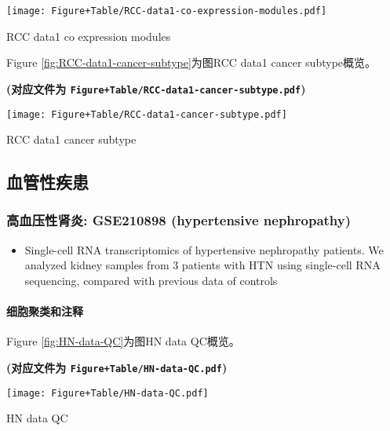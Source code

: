 \documentclass[
]{article}
\providecommand{\tightlist}{%
  \setlength{\itemsep}{0pt}\setlength{\parskip}{0pt}}
\begin{document}
\def\@captype{figure}
\begin{center}
\texttt{[image: Figure+Table/RCC-data1-co-expression-modules.pdf]}
\caption{RCC data1 co expression modules}\label{fig:RCC-data1-co-expression-modules}
\end{center}

Figure \ref{fig:RCC-data1-cancer-subtype}为图RCC data1 cancer subtype概览。

\textbf{(对应文件为 \texttt{Figure+Table/RCC-data1-cancer-subtype.pdf})}

\def\@captype{figure}
\begin{center}
\texttt{[image: Figure+Table/RCC-data1-cancer-subtype.pdf]}
\caption{RCC data1 cancer subtype}\label{fig:RCC-data1-cancer-subtype}
\end{center}

\hypertarget{ux8840ux7ba1ux6027ux75beux60a3}{%
\subsection{血管性疾患}\label{ux8840ux7ba1ux6027ux75beux60a3}}

\hypertarget{ux9ad8ux8840ux538bux6027ux80beux708e-gse210898-hypertensive-nephropathy}{%
\subsubsection{高血压性肾炎: GSE210898 (hypertensive nephropathy)}\label{ux9ad8ux8840ux538bux6027ux80beux708e-gse210898-hypertensive-nephropathy}}

\begin{itemize}
\tightlist
\item
  Single-cell RNA transcriptomics of hypertensive nephropathy patients. We
  analyzed kidney samples from 3 patients with HTN using single-cell RNA
  sequencing, compared with previous data of controls
\end{itemize}

\hypertarget{ux7ec6ux80deux805aux7c7bux548cux6ce8ux91ca-1}{%
\paragraph{细胞聚类和注释}\label{ux7ec6ux80deux805aux7c7bux548cux6ce8ux91ca-1}}

Figure \ref{fig:HN-data-QC}为图HN data QC概览。

\textbf{(对应文件为 \texttt{Figure+Table/HN-data-QC.pdf})}

\def\@captype{figure}
\begin{center}
\texttt{[image: Figure+Table/HN-data-QC.pdf]}
\caption{HN data QC}\label{fig:HN-data-QC}
\end{center}
\end{document}
